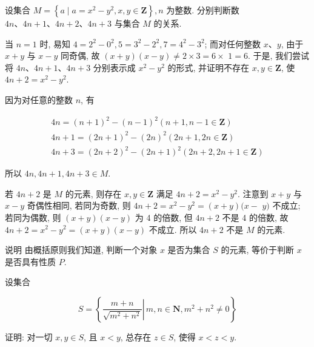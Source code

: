 \begin{example}
	设集合 $M=\left\{a \mid a=x^{2}-y^{2}, x, y \in \mathbf{Z}\right\}, n$ 为整数. 分别判断数 $4 n 、 4 n+1 、 4 n+2 、 4 n+3$ 与集合 $M$ 的关系.
\end{example}

\begin{analysis}
	当 $n=1$ 时, 易知 $4=2^{2}-0^{2}, 5=3^{2}-2^{2}, 7=4^{2}-3^{2}$; 而对任何整数 $x 、 y$, 由于 $x+y$ 与 $x-y$ 同奇偶, 故 $(x+y)(x-y) \neq 2 \times 3=6 \times$ $1=6$. 于是, 我们尝试将 $4 n 、 4 n+1 、 4 n+3$ 分别表示成 $x^{2}-y^{2}$ 的形式, 并证明不存在 $x, y \in \mathbf{Z}$, 使 $4 n+2=x^{2}-y^{2}$.
\end{analysis}

\begin{solution}
	因为对任意的整数 $n$, 有

	\begin{gather*}
		4 n=(n+1)^{2}-(n-1)^{2}(n+1, n-1 \in \mathbf{Z}) \\
		4 n+1=(2 n+1)^{2}-(2 n)^{2}(2 n+1,2 n \in \mathbf{Z}) \\
		4 n+3=(2 n+2)^{2}-(2 n+1)^{2}(2 n+2,2 n+1 \in \mathbf{Z})
	\end{gather*}

	所以 $4 n, 4 n+1,4 n+3 \in M$.

	若 $4 n+2$ 是 $M$ 的元素, 则存在 $x, y \in \mathbf{Z}$ 满足 $4 n+2=x^{2}-y^{2}$. 注意到 $x+y$ 与 $x-y$ 奇偶性相同, 若同为奇数, 则 $4 n+2=x^{2}-y^{2}=(x+y)(x-$ $y)$ 不成立; 若同为偶数, 则 $(x+y)(x-y)$ 为 4 的倍数, 但 $4 n+2$ 不是 4 的倍数, 故 $4 n+2=x^{2}-y^{2}=(x+y)(x-y)$ 不成立. 所以 $4 n+2$ 不是 $M$ 的元素.

	说明 由概括原则我们知道, 判断一个对象 $x$ 是否为集合 $S$ 的元素, 等价于判断 $x$ 是否具有性质 $P$.
\end{solution}

\begin{example}
	设集合

	$$
		S=\left\{\left.\frac{m+n}{\sqrt{m^{2}+n^{2}}} \right\rvert\, m, n \in \mathbf{N}, m^{2}+n^{2} \neq 0\right\}
	$$

	证明: 对一切 $x, y \in S$, 且 $x<y$, 总存在 $z \in S$, 使得 $x<z<y$.
\end{example}

